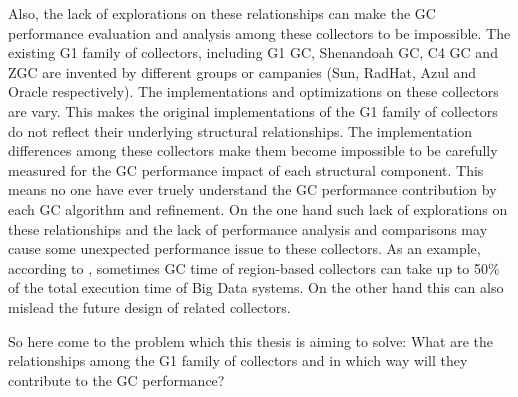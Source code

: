 Also, the lack of explorations on these relationships can make the GC performance evaluation
and analysis among these collectors to be impossible.
The existing G1 family of collectors, including
G1 GC, Shenandoah GC, C4 GC and ZGC are invented by different groups or campanies (Sun, RadHat, Azul and Oracle respectively).
The implementations and optimizations on these collectors are vary.
This makes the original implementations of the G1 family of collectors do not reflect
their underlying structural relationships.
The implementation differences among these collectors make them become impossible
to be carefully measured for the GC performance impact of each structural component.
This means no one have ever truely understand the GC performance contribution by each
GC algorithm and refinement.
On the one hand such lack of explorations on these relationships and the lack of
performance analysis and comparisons may cause some unexpected performance issue to these collectors.
As an example, according to \cite{briandemsky2015speculative}, sometimes GC time of region-based collectors
can take up to 50\% of the total execution time of Big Data systems.
On the other hand this can also mislead the future design of related collectors.

So here come to the problem which this thesis is aiming to solve: What are the relationships
among the G1 family of collectors and in which way will they contribute to the GC performance?





